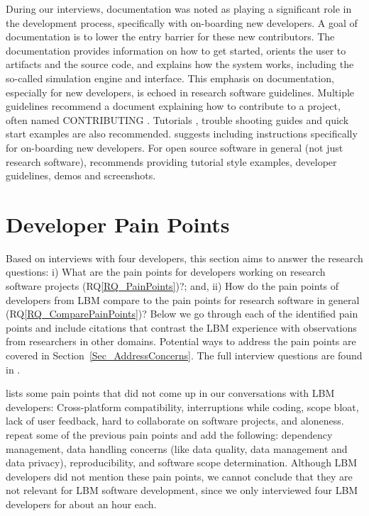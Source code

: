 \documentclass[final, 3p, times, authoryear]{elsarticle}
\newcommand{\rqref}[1]{RQ\ref{#1}}
\begin{document}
During our interviews, documentation was noted as playing a significant role in
the development process, specifically with on-boarding new developers. A goal of
documentation is to lower the entry barrier for these new contributors. The
documentation provides information on how to get started, orients the user to
artifacts and the source code, and explains how the system works, including the
so-called simulation engine and interface.  This emphasis on documentation,
especially for new developers, is echoed in research software guidelines.
Multiple guidelines recommend a document explaining how to contribute to a
project, often named CONTRIBUTING \citep{Yo2021, BrettEtAl2021, WilsonEtAl2016,
ThielEtAl2020, vanGompelEtAl2016, OrvizEtAl2017, FLOSS2022, JimenezEtAl2017}.
Tutorials \citep{ThielEtAl2020}, trouble shooting guides \citep{OrvizEtAl2017,
SSI2022} and quick start examples \citep{ThielEtAl2020, vanGompelEtAl2016} are
also recommended.  \citet{SmithAndRoscoe2018} suggests including instructions
specifically for on-boarding new developers. For open source software in general
(not just research software), \citet{Fogel2005} recommends providing tutorial
style examples, developer guidelines, demos and screenshots.

\section{Developer Pain Points} \label{painpoints}

Based on interviews with four developers, this section aims to answer the research questions: i) What are the pain points for developers working on research software projects (\rqref{RQ_PainPoints})?; and, ii) How do the pain points of developers from LBM compare to the pain points for research software in general (\rqref{RQ_ComparePainPoints})?  Below we go through each of the identified pain points and include citations that contrast the LBM experience with observations from researchers in other domains.  Potential ways to address the pain points are covered in Section~\ref{Sec_AddressConcerns}. The full interview questions are found in \citet{SmithEtAl2021}.

\citet{PintoEtAl2018} lists some pain points that did not come up in our
conversations with LBM developers: Cross-platform compatibility, interruptions
while coding, scope bloat, lack of user feedback, hard to collaborate on
software projects, and aloneness. \citet{WieseEtAl2019} repeat some of the
previous pain points and add the following: dependency management, data handling
concerns (like data quality, data management and data privacy), reproducibility,
and software scope determination. Although LBM developers did not mention these
pain points, we cannot conclude that they are not relevant for LBM software
development, since we only interviewed four LBM developers for about an hour each.
\end{document}
